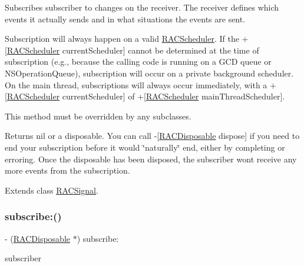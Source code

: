 Subscribes {\ttfamily subscriber} to changes on the receiver. The receiver defines which events it actually sends and in what situations the events are sent.

Subscription will always happen on a valid \mbox{\hyperlink{interface_r_a_c_scheduler}{R\+A\+C\+Scheduler}}. If the +\mbox{[}\mbox{\hyperlink{interface_r_a_c_scheduler}{R\+A\+C\+Scheduler}} current\+Scheduler\mbox{]} cannot be determined at the time of subscription (e.\+g., because the calling code is running on a G\+CD queue or N\+S\+Operation\+Queue), subscription will occur on a private background scheduler. On the main thread, subscriptions will always occur immediately, with a +\mbox{[}\mbox{\hyperlink{interface_r_a_c_scheduler}{R\+A\+C\+Scheduler}} current\+Scheduler\mbox{]} of +\mbox{[}\mbox{\hyperlink{interface_r_a_c_scheduler}{R\+A\+C\+Scheduler}} main\+Thread\+Scheduler\mbox{]}.

This method must be overridden by any subclasses.

Returns nil or a disposable. You can call -\/\mbox{[}\mbox{\hyperlink{interface_r_a_c_disposable}{R\+A\+C\+Disposable}} dispose\mbox{]} if you need to end your subscription before it would \char`\"{}naturally\char`\"{} end, either by completing or erroring. Once the disposable has been disposed, the subscriber won\textquotesingle{}t receive any more events from the subscription. 

Extends class \mbox{\hyperlink{interface_r_a_c_signal_aeab76d632d98bbc321ec5e19575377eb}{R\+A\+C\+Signal}}.

\mbox{\label{category_r_a_c_signal_07_subscription_08_aeab76d632d98bbc321ec5e19575377eb}} 
\subsubsection{\texorpdfstring{subscribe\+:()}{subscribe:()}\hspace{0.1cm}{\footnotesize\ttfamily [3/3]}}
{\footnotesize\ttfamily -\/ (\mbox{\hyperlink{interface_r_a_c_disposable}{R\+A\+C\+Disposable}} $\ast$) subscribe\+: \begin{DoxyParamCaption}\item[{(id$<$ \mbox{\hyperlink{interface_r_a_c_subscriber}{R\+A\+C\+Subscriber}} $>$)}]{subscriber }\end{DoxyParamCaption}}

